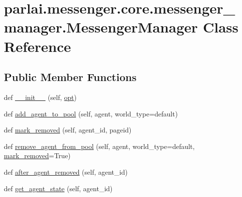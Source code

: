 \hypertarget{classparlai_1_1messenger_1_1core_1_1messenger__manager_1_1MessengerManager}{}\section{parlai.\+messenger.\+core.\+messenger\+\_\+manager.\+Messenger\+Manager Class Reference}
\label{classparlai_1_1messenger_1_1core_1_1messenger__manager_1_1MessengerManager}
\subsection*{Public Member Functions}
\begin{DoxyCompactItemize}
\item 
def \hyperlink{classparlai_1_1messenger_1_1core_1_1messenger__manager_1_1MessengerManager_ae6df147d84dc7760affada88f393d0cd}{\+\_\+\+\_\+init\+\_\+\+\_\+} (self, \hyperlink{classparlai_1_1messenger_1_1core_1_1messenger__manager_1_1MessengerManager_a26a3006d2fadd195105078dd49101cae}{opt})
\item 
def \hyperlink{classparlai_1_1messenger_1_1core_1_1messenger__manager_1_1MessengerManager_ac2b682c0085e42b1e14db6e973a5913d}{add\+\_\+agent\+\_\+to\+\_\+pool} (self, agent, world\+\_\+type=\textquotesingle{}default\textquotesingle{})
\item 
def \hyperlink{classparlai_1_1messenger_1_1core_1_1messenger__manager_1_1MessengerManager_acb4020e6765d2ab6ad722681b724826c}{mark\+\_\+removed} (self, agent\+\_\+id, pageid)
\item 
def \hyperlink{classparlai_1_1messenger_1_1core_1_1messenger__manager_1_1MessengerManager_a39c02eecd48359b564bddc86897cae4c}{remove\+\_\+agent\+\_\+from\+\_\+pool} (self, agent, world\+\_\+type=\textquotesingle{}default\textquotesingle{}, \hyperlink{classparlai_1_1messenger_1_1core_1_1messenger__manager_1_1MessengerManager_acb4020e6765d2ab6ad722681b724826c}{mark\+\_\+removed}=True)
\item 
def \hyperlink{classparlai_1_1messenger_1_1core_1_1messenger__manager_1_1MessengerManager_a238fe5e22bbe928848709edade7ba06c}{after\+\_\+agent\+\_\+removed} (self, agent\+\_\+id)
\item 
def \hyperlink{classparlai_1_1messenger_1_1core_1_1messenger__manager_1_1MessengerManager_aad51f1633f4d56d2a8812562f0608e03}{get\+\_\+agent\+\_\+state} (self, agent\+\_\+id)
\item 

\end{DoxyCompactItemize}
